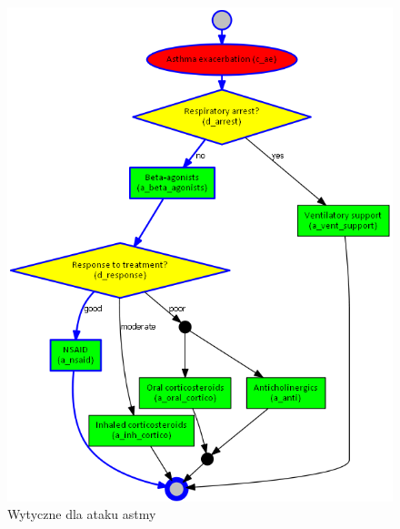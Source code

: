 \begin{figure}[H]
\centering
\includegraphics[scale=0.45]{img/asthma.png}
\caption{Wytyczne dla ataku astmy}
\label{fig:ag_ae}
\end{figure}

